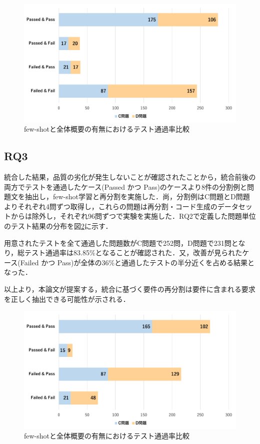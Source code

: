 \documentclass[submit,techrep,noauthor]{ipsj}
\begin{document}
\begin{figure}[t]
    \centering
    \includegraphics[width=1.0\linewidth]{./Toyoshima_fig/SIGSE_PF.pdf}
    \caption{few-shotと全体概要の有無におけるテスト通過率比較\protect\footnotemark}
    \label{rq2_1}
\end{figure}

\subsection{RQ3}
統合した結果，品質の劣化が発生しないことが確認されたことから，統合前後の両方でテストを通過したケース(Passed かつ Pass)のケースより8件の分割例と問題文を抽出し，few-shot学習と再分割を実施した．尚，分割例はC問題とD問題よりそれぞれ4問ずつ取得し，これらの問題は再分割・コード生成のデータセットからは除外し，それぞれ96問ずつで実験を実施した．RQ2で定義した問題単位のテスト結果の分布を図\ref{rq3_1}に示す．

用意されたテストを全て通過した問題数がC問題で252問，D問題で231問となり，総テスト通過率は83.85\%となることが確認された．又，改善が見られたケース(Failed かつ Pass)が全体の36\%と通過したテストの半分近くを占める結果となった．

以上より，本論文が提案する，統合に基づく要件の再分割は要件に含まれる要求を正しく抽出できる可能性が示される．

\begin{figure}[t]
    \centering
    \includegraphics[width=1.0\linewidth]{./Toyoshima_fig/RQ3_1.pdf}
    \caption{few-shotと全体概要の有無におけるテスト通過率比較\protect\footnotemark}
    \label{rq3_1}
\end{figure}
\end{document}
